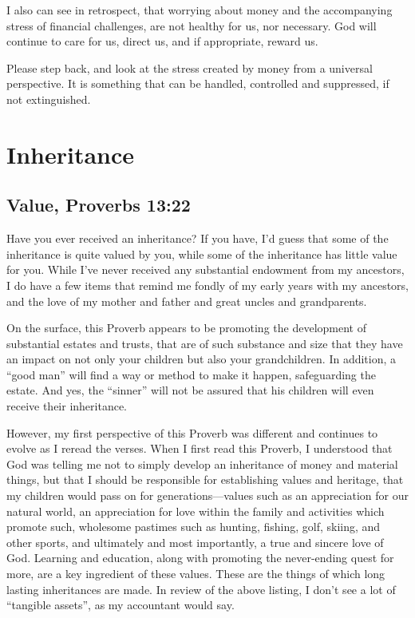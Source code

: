 \documentclass[12pt]{memoir}
\begin{document}
I also can see in retrospect, that worrying about money and the accompanying
stress of financial challenges, are not healthy for us, nor necessary.
God will continue to care for us, direct us, and if appropriate, reward
us. 

Please step back, and look at the stress created by money from a universal
perspective. It is something that can be handled, controlled and suppressed,
if not extinguished.

\section{Inheritance}

\subsection{Value, Proverbs 13:22}

Have you ever received an inheritance? If you have, I'd guess that
some of the inheritance is quite valued by you, while some of the
inheritance has little value for you. While I've never received any
substantial endowment from my ancestors, I do have a few items that
remind me fondly of my early years with my ancestors, and the love
of my mother and father and great uncles and grandparents. 

On the surface, this Proverb appears to be promoting the development
of substantial estates and trusts, that are of such substance and
size that they have an impact on not only your children but also your
grandchildren. In addition, a ``good man'' will find a way or method to make it happen, safeguarding the estate.
And yes, the ``sinner'' will not be assured that his children will even receive their inheritance. 

However, my first perspective of this Proverb was different and continues
to evolve as I reread the verses. When I first read this Proverb,
I understood that God was telling me not to simply develop an inheritance
of money and material things, but that I should be responsible for
establishing values and heritage, that my children would pass on for
generations---values such as an appreciation for our natural world,
an appreciation for love within the family and activities which promote
such, wholesome pastimes such as hunting, fishing, golf, skiing, and
other sports, and ultimately and most importantly, a true and sincere
love of God. Learning and education, along with promoting the never-ending
quest for more, are a key ingredient of these values. These are the
things of which long lasting inheritances are made. In review of the
above listing, I don't see a lot of ``tangible assets'', as my accountant
would say.
\end{document}
